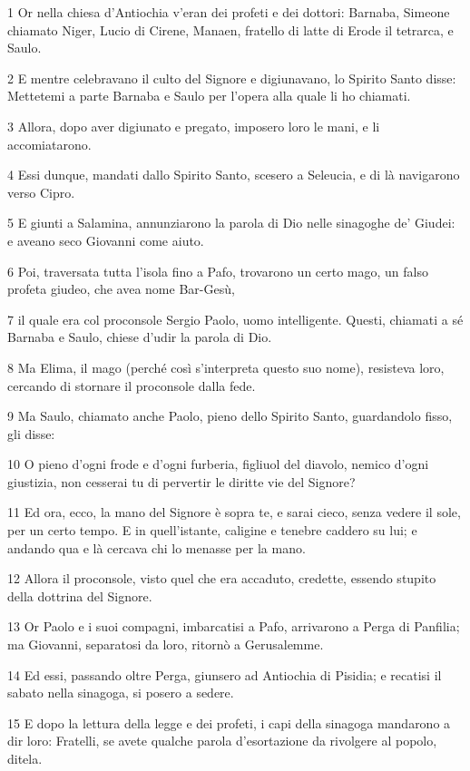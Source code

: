 \par 1 Or nella chiesa d'Antiochia v'eran dei profeti e dei dottori: Barnaba, Simeone chiamato Niger, Lucio di Cirene, Manaen, fratello di latte di Erode il tetrarca, e Saulo.
\par 2 E mentre celebravano il culto del Signore e digiunavano, lo Spirito Santo disse: Mettetemi a parte Barnaba e Saulo per l'opera alla quale li ho chiamati.
\par 3 Allora, dopo aver digiunato e pregato, imposero loro le mani, e li accomiatarono.
\par 4 Essi dunque, mandati dallo Spirito Santo, scesero a Seleucia, e di là navigarono verso Cipro.
\par 5 E giunti a Salamina, annunziarono la parola di Dio nelle sinagoghe de' Giudei: e aveano seco Giovanni come aiuto.
\par 6 Poi, traversata tutta l'isola fino a Pafo, trovarono un certo mago, un falso profeta giudeo, che avea nome Bar-Gesù,
\par 7 il quale era col proconsole Sergio Paolo, uomo intelligente. Questi, chiamati a sé Barnaba e Saulo, chiese d'udir la parola di Dio.
\par 8 Ma Elima, il mago (perché così s'interpreta questo suo nome), resisteva loro, cercando di stornare il proconsole dalla fede.
\par 9 Ma Saulo, chiamato anche Paolo, pieno dello Spirito Santo, guardandolo fisso, gli disse:
\par 10 O pieno d'ogni frode e d'ogni furberia, figliuol del diavolo, nemico d'ogni giustizia, non cesserai tu di pervertir le diritte vie del Signore?
\par 11 Ed ora, ecco, la mano del Signore è sopra te, e sarai cieco, senza vedere il sole, per un certo tempo. E in quell'istante, caligine e tenebre caddero su lui; e andando qua e là cercava chi lo menasse per la mano.
\par 12 Allora il proconsole, visto quel che era accaduto, credette, essendo stupito della dottrina del Signore.
\par 13 Or Paolo e i suoi compagni, imbarcatisi a Pafo, arrivarono a Perga di Panfilia; ma Giovanni, separatosi da loro, ritornò a Gerusalemme.
\par 14 Ed essi, passando oltre Perga, giunsero ad Antiochia di Pisidia; e recatisi il sabato nella sinagoga, si posero a sedere.
\par 15 E dopo la lettura della legge e dei profeti, i capi della sinagoga mandarono a dir loro: Fratelli, se avete qualche parola d'esortazione da rivolgere al popolo, ditela.
